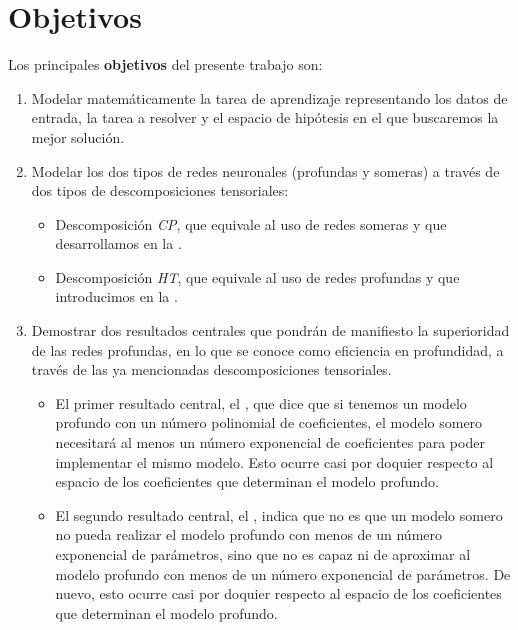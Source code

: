 \section{Objetivos}

Los principales \textbf{objetivos} del presente trabajo son:

\begin{enumerate}
	\item Modelar matemáticamente la tarea de aprendizaje representando los datos de entrada, la tarea a resolver y el espacio de hipótesis en el que buscaremos la mejor solución.
	\item Modelar los dos tipos de redes neuronales (profundas y someras) a través de dos tipos de descomposiciones tensoriales:
	      \begin{itemize}
		      \item Descomposición \textit{CP}, que equivale al uso de redes someras  y que desarrollamos en la .
		      \item Descomposición \textit{HT}, que equivale al uso de redes profundas y que introducimos en la .
	      \end{itemize}
	\item Demostrar dos resultados centrales que pondrán de manifiesto la superioridad de las redes profundas, en lo que se conoce como eficiencia en profundidad, a través de las ya mencionadas descomposiciones tensoriales.
	      \begin{itemize}
		      \item El primer resultado central, el , que dice que si tenemos un modelo profundo con un número polinomial de coeficientes, el modelo somero necesitará al menos un número exponencial de coeficientes para poder implementar el mismo modelo. Esto ocurre casi por doquier respecto al espacio de los coeficientes que determinan el modelo profundo.
		      \item El segundo resultado central, el , indica que no es que un modelo somero no pueda realizar el modelo profundo con menos de un número exponencial de parámetros, sino que no es capaz ni de aproximar al modelo profundo con menos de un número exponencial de parámetros. De nuevo, esto ocurre casi por doquier respecto al espacio de los coeficientes que determinan el modelo profundo.
	      \end{itemize}
\end{enumerate}

